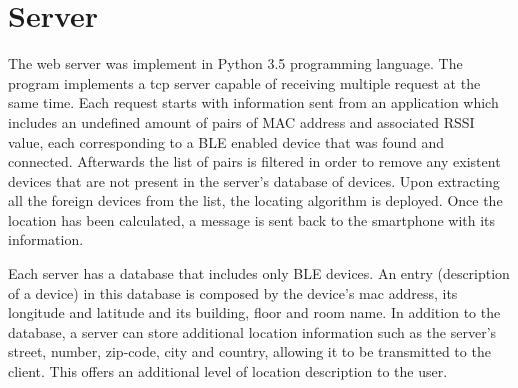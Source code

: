 \section{Server} 
\label{sec:server} 
 
 
The web server was implement in Python 3.5 programming language. The program implements a tcp server capable of receiving multiple request at the same time. Each request starts with information sent from an application which includes an undefined amount of pairs of MAC address and associated RSSI value, each corresponding to a \ac{BLE} enabled device that was found and connected. Afterwards the list of pairs is filtered in order to remove any existent devices that are not present in the server's database of devices. Upon extracting all the foreign devices from the list, the locating algorithm is deployed. Once the location has been calculated, a message is sent back to the smartphone with its information.  
 
 
Each server has a database that includes only \ac{BLE} devices. An entry (description of a device) in this database is composed by the device's mac address, its longitude and latitude and its building, floor and room name. In addition to the database, a server can store additional location information such as the server's street, number, zip-code, city and country, allowing it to be transmitted to the client. This offers an additional level of location description to the user.  
 